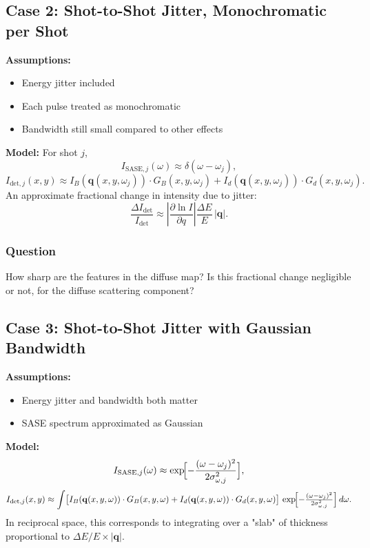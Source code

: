 \documentclass[12pt,a4paper]{article}
\begin{document}
\subsection{Case 2: Shot-to-Shot Jitter, Monochromatic per Shot}
\textbf{Assumptions:}
\begin{itemize}
\item Energy jitter included
\item Each pulse treated as monochromatic
\item Bandwidth still small compared to other effects
\end{itemize}
\textbf{Model:}
For shot $j$,
\begin{equation}
I_{\text{SASE},j}(\omega) \approx \delta(\omega - \omega_j),
\end{equation}
\begin{equation}
I_{\text{det},j}(x,y) \approx I_B(\mathbf{q}(x,y,\omega_j)) \cdot G_B(x,y,\omega_j) + I_d(\mathbf{q}(x,y,\omega_j)) \cdot G_d(x,y,\omega_j).
\end{equation}
An approximate fractional change in intensity due to jitter:
\begin{equation}
\frac{\Delta I_{\text{det}}}{I_{\text{det}}} \approx \left|\frac{\partial \ln I}{\partial q}\right|\frac{\Delta E}{E}\,|\mathbf{q}|.
\end{equation}

\subsubsection*{Question}
How sharp are the features in the diffuse map? Is this fractional change negligible or not, for the diffuse scattering component?

\subsection{Case 3: Shot-to-Shot Jitter with Gaussian Bandwidth}
\textbf{Assumptions:}
\begin{itemize}
\item Energy jitter and bandwidth both matter
\item SASE spectrum approximated as Gaussian
\end{itemize}
\textbf{Model:}
\begin{equation}
I_{\text{SASE},j}(\omega) \approx \exp\!\Bigl[-\frac{(\omega - \omega_j)^2}{2\sigma_{\omega,j}^2}\Bigr],
\end{equation}
\begin{equation}
I_{\text{det},j}(x,y) \approx \int \bigl[I_B(\mathbf{q}(x,y,\omega)) \cdot G_B(x,y,\omega) + I_d(\mathbf{q}(x,y,\omega)) \cdot G_d(x,y,\omega)\bigr]\,
\exp\!\Bigl[-\tfrac{(\omega - \omega_j)^2}{2\sigma_{\omega,j}^2}\Bigr]\, d\omega.
\end{equation}
In reciprocal space, this corresponds to integrating over a "slab" of thickness proportional to $\Delta E/E \times |\mathbf{q}|$.
\end{document}
